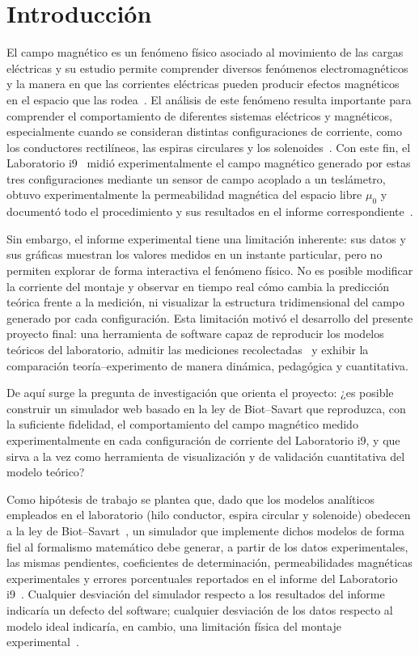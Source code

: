 \documentclass{article}
\begin{document}
\section{Introducción} \label{sec:introduccion}

El campo magnético es un fenómeno físico asociado al movimiento de las cargas eléctricas y su estudio permite comprender diversos fenómenos electromagnéticos y la manera en que las corrientes eléctricas pueden producir efectos magnéticos en el espacio que las rodea~\cite{young2009}. El análisis de este fenómeno resulta importante para comprender el comportamiento de diferentes sistemas eléctricos y magnéticos, especialmente cuando se consideran distintas configuraciones de corriente, como los conductores rectilíneos, las espiras circulares y los solenoides~\cite{giancoli2009}. Con este fin, el Laboratorio i9~\cite{guiaI9} midió experimentalmente el campo magnético generado por estas tres configuraciones mediante un sensor de campo acoplado a un teslámetro, obtuvo experimentalmente la permeabilidad magnética del espacio libre $\mu_0$ y documentó todo el procedimiento y sus resultados en el informe correspondiente~\cite{labi9rep}.

Sin embargo, el informe experimental tiene una limitación inherente: sus datos y sus gráficas muestran los valores medidos en un instante particular, pero no permiten explorar de forma interactiva el fenómeno físico. No es posible modificar la corriente del montaje y observar en tiempo real cómo cambia la predicción teórica frente a la medición, ni visualizar la estructura tridimensional del campo generado por cada configuración. Esta limitación motivó el desarrollo del presente proyecto final: una herramienta de software capaz de reproducir los modelos teóricos del laboratorio, admitir las mediciones recolectadas~\cite{labi9rep} y exhibir la comparación teoría--experimento de manera dinámica, pedagógica y cuantitativa.

De aquí surge la pregunta de investigación que orienta el proyecto: ¿es posible construir un simulador web basado en la ley de Biot--Savart que reproduzca, con la suficiente fidelidad, el comportamiento del campo magnético medido experimentalmente en cada configuración de corriente del Laboratorio i9, y que sirva a la vez como herramienta de visualización y de validación cuantitativa del modelo teórico?~\cite{guiaI9}

Como hipótesis de trabajo se plantea que, dado que los modelos analíticos empleados en el laboratorio (hilo conductor, espira circular y solenoide) obedecen a la ley de Biot--Savart~\cite{young2009}, un simulador que implemente dichos modelos de forma fiel al formalismo matemático debe generar, a partir de los datos experimentales, las mismas pendientes, coeficientes de determinación, permeabilidades magnéticas experimentales y errores porcentuales reportados en el informe del Laboratorio i9~\cite{labi9rep}. Cualquier desviación del simulador respecto a los resultados del informe indicaría un defecto del software; cualquier desviación de los datos respecto al modelo ideal indicaría, en cambio, una limitación física del montaje experimental~\cite{labi9rep}.
\end{document}
